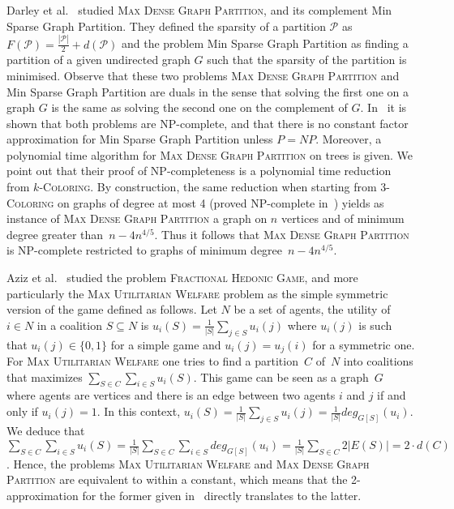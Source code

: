 \documentclass[a4paper,USenglish,cleveref, autoref]{lipics-v2021}
\newcommand\MDGP{\textsc{Max Dense Graph Partition}}
\begin{document}

Darley et al.~\cite{bib:density:darlay2012DENSE} studied   \MDGP, and its complement  {\sc Min Sparse Graph Partition}. They defined  the  sparsity of a partition $\mathcal{P}$ as $F(\mathcal{P})= \frac{|\mathcal{P}|}{2} + d(\mathcal{P})$ and the  problem {\sc Min Sparse Graph Partition} as finding a partition of a given undirected graph $G$ such that the sparsity of the partition is minimised. Observe that these two problems \MDGP{} and  {\sc Min Sparse Graph Partition} are duals in the sense that solving the first one on a graph $G$ is the same as solving the second one on the complement of $G$. In~\cite{bib:density:darlay2012DENSE} it is shown that both problems are NP-complete, and that there is no constant factor approximation for  {\sc Min Sparse Graph Partition} unless $P=NP$.  Moreover, a polynomial time algorithm for \MDGP{} on trees is given.
We point out that their proof of NP-completeness is a polynomial time reduction from \textsc{$k$-Coloring}. By construction, the same reduction when starting from \textsc{3-Coloring} on graphs of degree at most 4 (proved NP-complete in~\cite{GJS1976}) yields as instance of \MDGP{} a graph on $n$ vertices and of minimum degree greater than~$n-4n^{4/5}$. Thus it follows that  \MDGP{} is NP-complete restricted to graphs of minimum degree~$n-4n^{4/5}$.


Aziz et al.~\cite{bib:density:aziz2015welfare} studied the problem \textsc{Fractional Hedonic Game}, and more particularly the \textsc{Max Utilitarian Welfare} problem as the simple symmetric version of the game defined as follows. Let $N$ be a set of agents, the utility of $i \in N$ in a coalition $S \subseteq N$ is $u_i(S) = \tfrac 1{|S|}{\sum_{j \in S}u_i(j)}$ where $u_i(j)$ is such that $u_i(j) \in \{0,1\}$ for a simple game and $u_i(j) = u_j(i)$ for a symmetric one. For \textsc{Max Utilitarian Welfare} one tries to find a partition~$C$ of~$N$ into coalitions that maximizes $\sum_{S \in C}\sum_{i \in S}u_i(S)$. This game can be seen as a graph~$G$ where agents are  vertices and there is an edge between two agents $i$ and $j$ if and only if $u_i(j)=1$.
In this context, $u_i(S) = \tfrac 1{|S|}{\sum_{j \in S}u_i(j)} = \tfrac 1{|S|}deg_{G[S]}(u_i)$. We deduce that $\sum_{S \in C}\sum_{i \in S}u_i(S) =\tfrac 1{|S|} \sum_{S \in C}\sum_{i \in S} deg_{G[S]}(u_i) = \tfrac 1{|S|}\sum_{S \in C}  {2|E(S)|} = 2 \cdot d(C)$. Hence, the problems \textsc{Max Utilitarian Welfare} and \MDGP{} are equivalent to within a constant, which means that the 2-approximation for the former given in~\cite{bib:density:aziz2015welfare} directly translates to the latter.
 
\end{document}
